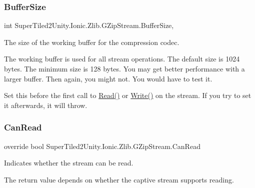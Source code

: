 \subsubsection{\texorpdfstring{Buffer\+Size}{BufferSize}}
{\footnotesize\ttfamily int Super\+Tiled2\+Unity.\+Ionic.\+Zlib.\+G\+Zip\+Stream.\+Buffer\+Size\hspace{0.3cm}{\ttfamily [get]}, {\ttfamily [set]}}



The size of the working buffer for the compression codec. 

The working buffer is used for all stream operations. The default size is 1024 bytes. The minimum size is 128 bytes. You may get better performance with a larger buffer. Then again, you might not. You would have to test it. 

Set this before the first call to {\ttfamily \mbox{\hyperlink{class_super_tiled2_unity_1_1_ionic_1_1_zlib_1_1_g_zip_stream_a772b5013a585850ffaf8be4aa7f3dbcf}{Read()}}} or {\ttfamily \mbox{\hyperlink{class_super_tiled2_unity_1_1_ionic_1_1_zlib_1_1_g_zip_stream_a49032afb5806563236a5d53841abe2b8}{Write()}}} on the stream. If you try to set it afterwards, it will throw. \mbox{\label{class_super_tiled2_unity_1_1_ionic_1_1_zlib_1_1_g_zip_stream_a6340afe9b11c6b17cd965ca153d75f27}} 
\subsubsection{\texorpdfstring{Can\+Read}{CanRead}}
{\footnotesize\ttfamily override bool Super\+Tiled2\+Unity.\+Ionic.\+Zlib.\+G\+Zip\+Stream.\+Can\+Read\hspace{0.3cm}{\ttfamily [get]}}



Indicates whether the stream can be read. 

The return value depends on whether the captive stream supports reading. \mbox{\label{class_super_tiled2_unity_1_1_ionic_1_1_zlib_1_1_g_zip_stream_a3a02ff35fb1b66b953a9cbda586871b8}} 
